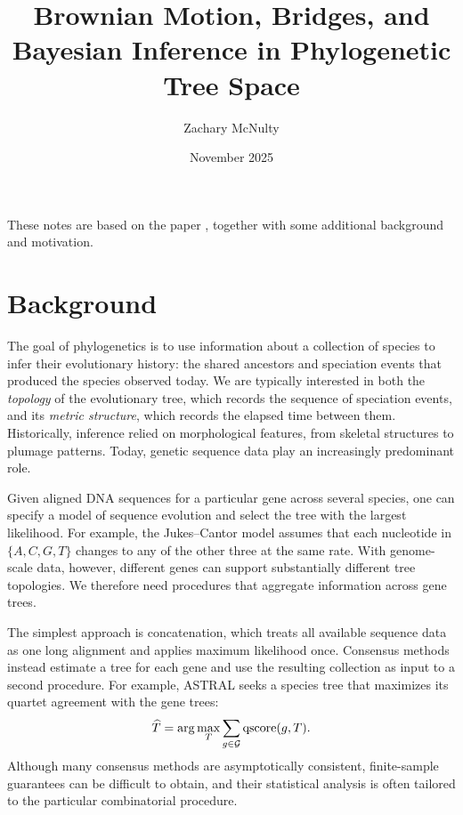
\usepackage[authoryear,square]{natbib}
\usetikzlibrary{positioning}


\title{Brownian Motion, Bridges, and Bayesian Inference in Phylogenetic Tree Space}
\author{Zachary McNulty}
\date{November 2025}





\maketitle

\hacross

\noindent These notes are based on the paper
\cite{woodman2025brownianmotionbridgesbayesian}, together with some additional
background and motivation.

\section{Background}

The goal of phylogenetics is to use information about a collection of species
to infer their evolutionary history: the shared ancestors and speciation events
that produced the species observed today. We are typically interested in both
the \textit{topology} of the evolutionary tree, which records the sequence of
speciation events, and its \textit{metric structure}, which records the elapsed
time between them. Historically, inference relied on morphological features,
from skeletal structures to plumage patterns. Today, genetic sequence data play
an increasingly predominant role.

Given aligned DNA sequences for a particular gene across several species, one
can specify a model of sequence evolution and select the tree with the largest
likelihood. For example, the Jukes--Cantor model assumes that each nucleotide in
$\{A,C,G,T\}$ changes to any of the other three at the same rate. With genome-scale
data, however, different genes can support substantially different tree
topologies. We therefore need procedures that aggregate information across gene
trees.

The simplest approach is concatenation, which treats all available sequence
data as one long alignment and applies maximum likelihood once. Consensus
methods instead estimate a tree for each gene and use the resulting collection
as input to a second procedure. For example, ASTRAL
\cite{mirarab2014astral} seeks a species tree that maximizes its quartet
agreement with the gene trees:
%
\[\widehat{T}=\arg\max_T\sum_{g\in{\mathcal G}}
  \operatorname{qscore}(g,T).\]
%
\noindent Although many consensus methods are asymptotically consistent,
finite-sample guarantees can be difficult to obtain, and their statistical
analysis is often tailored to the particular combinatorial procedure.

